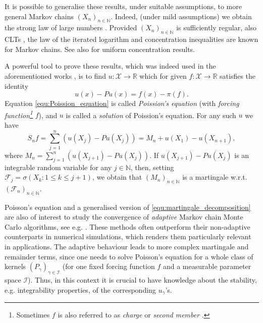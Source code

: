 \documentclass[12pt]{article}
\theoremstyle{plain}
\newcommand{\N}{\mathbb{N}}
\newcommand{\R}{\mathbb{R}}
\newcommand{\cX}{\mathcal{X}}
\begin{document}
It is possible to generalise these results, under suitable assumptions, to more general Markov chains $(X_n)_{n \in \N}$.
Indeed, (under mild assumptions) we obtain the strong law of large numbers \cite{asmussen2011ergodic}. 
Provided $(X_n)_{n \in \N}$ is sufficiently regular, also CLTs \cite{maigret1978theoreme,douc2018markov}, the law of the iterated logarithm \cite{meyn2009markov,bolt2012invariance} and concentration inequalities \cite{GLYNN2002hoeffding,MIASOJEDOW2014hoeffding} are known for Markov chains.
See also \cite{adamczak2008tail,adamczak2015exponential} for uniform concentration results.


A powerful tool to prove these results, which was indeed used in the aforementioned works \cite{douc2018markov,GLYNN2002hoeffding,meyn2009markov,bolt2012invariance,maigret1978theoreme}, is to find $u \colon \cX \to \R$ which for given $f\colon \cX \to \R$ satisfies the identity  
\begin{equation}\label{equ:Poission_equation}
u(x) - Pu(x) = f(x) - \pi(f).
\end{equation}
Equation \eqref{equ:Poission_equation} is called \textit{Poission's equation} (with \textit{forcing function\footnote{Sometimes $f$ is also referred to as \textit{charge} \cite{nummelin1991poisson} or \textit{second member} \cite{revuz1984markov}.}} $f$), and $u$ is called a \textit{solution} of Poission's equation.
For any such $u$ we have 
\begin{equation}\label{equ:martingale_decomposition}
S_n f = \sum_{j=1}^n\left(  u(X_j) - Pu(X_j)\right) = M_n + u(X_1) -u(X_{n+1}), 
\end{equation}
where $M_n = \sum_{j=1}^n\left(  u(X_{j+1}) - Pu(X_j)\right)$.
If $u(X_{j+1}) - Pu(X_j)$ is an integrable random variable for any $j\in \N$, then, setting $\mathcal{F}_j = \sigma(X_k \colon 1 \leq k \leq j+1)$, we obtain that $(M_n)_{n \in \N}$ is a martingale w.r.t.~$(\mathcal{F}_n)_{n \in\N}$.  

Poisson's equation and a generalised version of \eqref{equ:martingale_decomposition} are also of interest to study the convergence of \textit{adaptive} Markov chain Monte Carlo algorithms, see e.g. \cite{andrieu2006ergodicity,saksman2010ergodicity,atchade2013Bayesian,hofstadler2024convergenceRates,laitinen2024invitation}.
These methods often outperform their non-adaptive counterparts in numerical simulations, which renders them particularly relevant in applications. 
The adaptive behaviour leads to more complex martingale and remainder terms, since one needs to solve Poisson's equation for a whole class of kernels $(P_\gamma)_{\gamma \in \mathcal{I}}$ (for one fixed forcing function $f$ and a measurable parameter space $\mathcal{I}$). 
Thus, in this context it is crucial to have knowledge about the stability, e.g. integrability properties, of the corresponding $u_\gamma$'s.  
\end{document}
